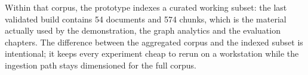 Within that corpus, the prototype indexes a curated working subset: the last validated build contains 54 documents and 574 chunks, which is the material actually used by the demonstration, the graph analytics and the evaluation chapters. The difference between the aggregated corpus and the indexed subset is intentional; it keeps every experiment cheap to rerun on a workstation while the ingestion path stays dimensioned for the full corpus.
